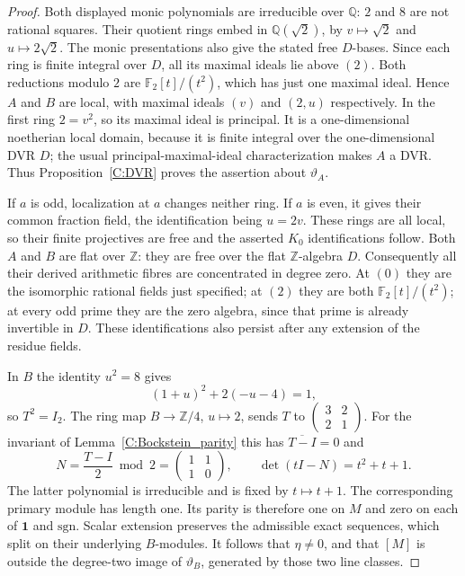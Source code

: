 \begin{proof}
Both displayed monic polynomials are irreducible over $\mathbb Q$:
$2$ and $8$ are not rational squares. Their quotient rings embed in
$\mathbb Q(\sqrt2)$, by $v\mapsto\sqrt2$ and $u\mapsto2\sqrt2$.
The monic presentations also give the stated free $D$-bases.
Since each ring is finite integral over $D$, all its maximal ideals
lie above $(2)$. Both reductions modulo $2$ are
$\mathbb F_2[t]/(t^2)$, which has just one maximal ideal. Hence
$A$ and $B$ are local, with maximal ideals $(v)$ and $(2,u)$
respectively. In the first ring $2=v^2$, so its maximal ideal is
principal. It is a one-dimensional noetherian local domain, because
it is finite integral over the one-dimensional DVR $D$; the usual
principal-maximal-ideal characterization makes $A$ a DVR. Thus
Proposition~\ref{C:DVR} proves the assertion about $\vartheta_A$.

If $a$ is odd, localization at $a$ changes neither ring. If $a$ is
even, it gives their common fraction field, the identification being
$u=2v$. These rings are all local, so their finite projectives are
free and the asserted $K_0$ identifications follow. Both $A$ and
$B$ are flat over $\mathbb Z$: they are free over the flat
$\mathbb Z$-algebra $D$. Consequently all their derived arithmetic
fibres are concentrated in degree zero. At $(0)$ they are the
isomorphic rational fields just specified; at $(2)$ they are both
$\mathbb F_2[t]/(t^2)$; at every odd prime they are the zero algebra,
since that prime is already invertible in $D$. These identifications
also persist after any extension of the residue fields.

In $B$ the identity $u^2=8$ gives
\[
 (1+u)^2+2(-u-4)=1,
\]
so $T^2=I_2$. The ring map
$B\to\mathbb Z/4$, $u\mapsto2$, sends $T$ to
$\left(\begin{smallmatrix}3&2\\2&1\end{smallmatrix}\right)$.
For the invariant of Lemma~\ref{C:Bockstein_parity} this has
$\overline{T-I}=0$ and
\[
 N=\frac{T-I}{2}\bmod2
   =\begin{pmatrix}1&1\\1&0\end{pmatrix},\qquad
 \det(tI-N)=t^2+t+1.
\]
The latter polynomial is irreducible and is fixed by $t\mapsto t+1$.
The corresponding primary module has length one. Its parity is
therefore one on $M$ and zero on each of $\mathbf1$ and
$\mathrm{sgn}$. Scalar extension preserves the admissible exact
sequences, which split on their underlying $B$-modules. It follows
that $\eta\ne0$, and that $[M]$ is outside the degree-two image of
$\vartheta_B$, generated by those two line classes.


\end{proof}
